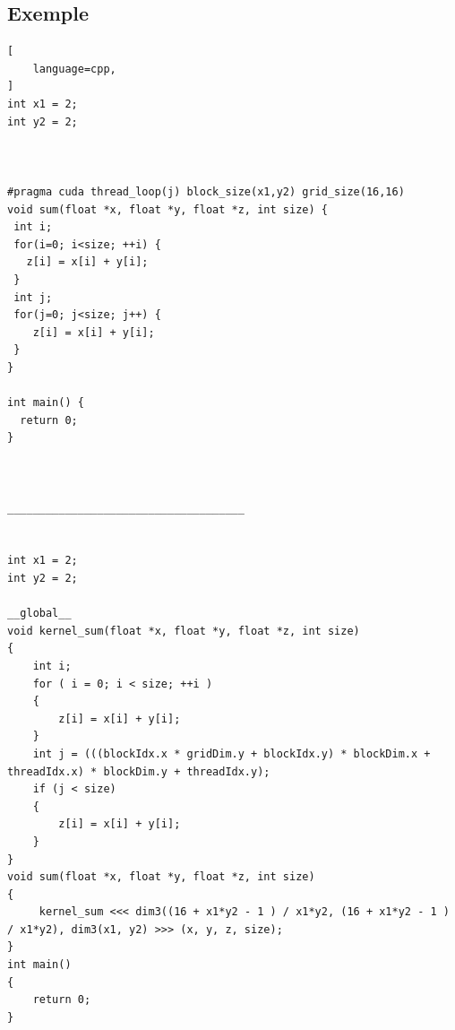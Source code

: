 \documentclass{article}
\begin{document}
	\subsection{Exemple}

	\begin{lstlisting}[
    language=cpp,
]
int x1 = 2;
int y2 = 2;



#pragma cuda thread_loop(j) block_size(x1,y2) grid_size(16,16)
void sum(float *x, float *y, float *z, int size) {
 int i;
 for(i=0; i<size; ++i) {
   z[i] = x[i] + y[i];
 }
 int j;
 for(j=0; j<size; j++) {
    z[i] = x[i] + y[i];
 }
}

int main() {
  return 0;
}



_____________________________________


int x1 = 2;
int y2 = 2;

__global__
void kernel_sum(float *x, float *y, float *z, int size)
{
	int i;
	for ( i = 0; i < size; ++i )
	{
		z[i] = x[i] + y[i];
	}
	int j = (((blockIdx.x * gridDim.y + blockIdx.y) * blockDim.x + threadIdx.x) * blockDim.y + threadIdx.y);
	if (j < size)
	{
		z[i] = x[i] + y[i];
	}
}
void sum(float *x, float *y, float *z, int size)
{
	 kernel_sum <<< dim3((16 + x1*y2 - 1 ) / x1*y2, (16 + x1*y2 - 1 ) / x1*y2), dim3(x1, y2) >>> (x, y, z, size);
}
int main()
{
	return 0;
}
\end{lstlisting}
\end{document}
